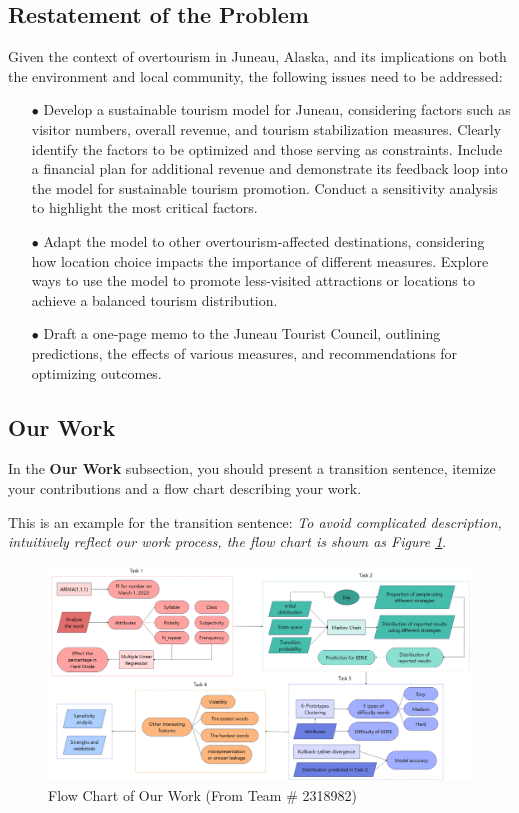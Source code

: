 \documentclass[12pt]{article}  %
\begin{document}
 \subsection{Restatement of the Problem}
 Given the context of overtourism in Juneau, Alaska, and its implications on both the environment and local community, the following issues need to be addressed:
 \begin{itemize}
    \item[$\bullet$]Develop a sustainable tourism model for Juneau, considering factors such as visitor numbers, overall revenue, and tourism stabilization measures. Clearly identify the factors to be optimized and those serving as constraints. Include a financial plan for additional revenue and demonstrate its feedback loop into the model for sustainable tourism promotion. Conduct a sensitivity analysis to highlight the most critical factors.
    \item[$\bullet$]Adapt the model to other overtourism-affected destinations, considering how location choice impacts the importance of different measures. Explore ways to use the model to promote less-visited attractions or locations to achieve a balanced tourism distribution.
    \item[$\bullet$]Draft a one-page memo to the Juneau Tourist Council, outlining predictions, the effects of various measures, and recommendations for optimizing outcomes.
 \end{itemize}
\subsection{Our Work}
 
 In the \textbf{Our Work} subsection, you should present a transition sentence, itemize your contributions and a flow chart describing your work. 
 
 This is an example for the transition sentence:  \textit{To avoid complicated description, intuitively reflect our work process, the flow chart is shown as Figure \ref{fig1}}.
  
 
 
 \begin{figure}[htbp]  %
 
 \centering  %
 \includegraphics[width=.9\textwidth]{Flow_Chart.png} %
 \caption{Flow Chart of Our Work (From Team \# 2318982)} %
 \label{fig1}%
 \end{figure}
 
\end{document}
